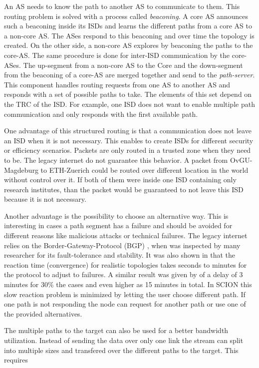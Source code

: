 \documentclass[thesis.tex]{subfiles}
\begin{document}
An AS needs to know the path to another AS to communicate to them. This routing problem is solved with a process called \textit{beaconing}. A core AS announces such a beaconing inside its ISDs and learns the different paths from a core AS to a non-core AS. The ASes respond to this beaconing and over time the topology is created. On the other side, a non-core AS explores by beaconing the paths to the core-AS. The same procedure is done for inter-ISD communication by the core-ASes. The up-segment from a non-core AS to the Core and the down-segment from the beaconing of a core-AS are merged together and send to the \textit{path-server}. This component handles routing requests from one AS to another AS and responds with a set of possible paths to take. The elements of this set depend on the TRC of the ISD. For example, one ISD does not want to enable multiple path communication and only responds with the first available path.

One advantage of this structured routing is that a communication does not leave an ISD when it is not necessary. This enables to create ISDs for different security or efficiency scenarios. Packets are only routed in a trusted zone when they need to be. The legacy internet do not guarantee this behavior. A packet from OvGU-Magdeburg to ETH-Zuerich could be routed over different location in the world without control over it. If both of them were inside one ISD containing only research institutes, than the packet would be guaranteed to not leave this ISD because it is not necessary.

Another advantage is the possibility to choose an alternative way. This is interesting in cases a path segment has a failure and should be avoided for different reasons like malicious attacks or technical failures. The legacy internet relies on the Border-Gateway-Protocol (BGP) \cite{rekhter2005border, Halabi.1997}, when was inspected by many researcher for its fault-tolerance and stability. It was also shown in \cite{Sahoo.2006} that the reaction time (convergence) for realistic topologies takes seconds to minutes for the protocol to adjust to failures. A similar result was given by \cite{Labovitz.2001} of a delay of 3 minutes for 30\% the cases and even higher as 15 minutes in total. In SCION this slow reaction problem is minimized by letting the user choose different path. If one path is not responding the node can request for another path or use one of the provided alternatives.

The multiple paths to the target can also be used for a better bandwidth utilization. Instead of sending the data over only one link the stream can split into multiple sizes and transfered over the different paths to the target. This requires 
\end{document}

